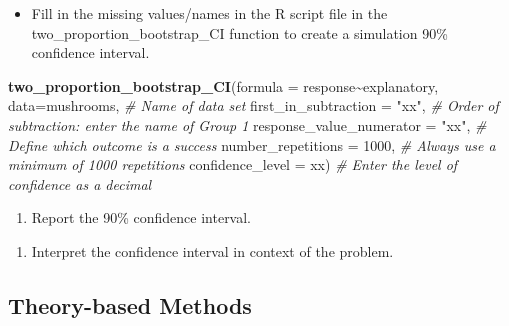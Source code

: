 \documentclass[
]{report}
\newenvironment{Shaded}{\begin{snugshade}}{\end{snugshade}}
\newcommand{\AttributeTok}[1]{\textcolor[rgb]{0.13,0.29,0.53}{#1}}
\newcommand{\CommentTok}[1]{\textcolor[rgb]{0.56,0.35,0.01}{\textit{#1}}}
\newcommand{\DecValTok}[1]{\textcolor[rgb]{0.00,0.00,0.81}{#1}}
\newcommand{\FunctionTok}[1]{\textcolor[rgb]{0.13,0.29,0.53}{\textbf{#1}}}
\newcommand{\NormalTok}[1]{#1}
\newcommand{\SpecialCharTok}[1]{\textcolor[rgb]{0.81,0.36,0.00}{\textbf{#1}}}
\newcommand{\StringTok}[1]{\textcolor[rgb]{0.31,0.60,0.02}{#1}}
\providecommand{\tightlist}{%
  \setlength{\itemsep}{0pt}\setlength{\parskip}{0pt}}
\begin{document}
\vspace{.15in}

\begin{itemize}
\tightlist
\item
  Fill in the missing values/names in the R script file in the two\_proportion\_bootstrap\_CI function to create a simulation 90\% confidence interval.
\end{itemize}

\begin{Shaded}
\begin{Highlighting}[]
\FunctionTok{two\_proportion\_bootstrap\_CI}\NormalTok{(}\AttributeTok{formula =}\NormalTok{ response}\SpecialCharTok{\textasciitilde{}}\NormalTok{explanatory, }
         \AttributeTok{data=}\NormalTok{mushrooms, }\CommentTok{\# Name of data set}
         \AttributeTok{first\_in\_subtraction =} \StringTok{"xx"}\NormalTok{, }\CommentTok{\# Order of subtraction: enter the name of Group 1}
         \AttributeTok{response\_value\_numerator =} \StringTok{"xx"}\NormalTok{, }\CommentTok{\# Define which outcome is a success }
         \AttributeTok{number\_repetitions =} \DecValTok{1000}\NormalTok{, }\CommentTok{\# Always use a minimum of 1000 repetitions}
         \AttributeTok{confidence\_level =}\NormalTok{ xx) }\CommentTok{\# Enter the level of confidence as a decimal}
\end{Highlighting}
\end{Shaded}

\begin{enumerate}
\def\labelenumi{\arabic{enumi}.}
\setcounter{enumi}{7}
\tightlist
\item
  Report the 90\% confidence interval.
\end{enumerate}

\vspace{0.2in}

\begin{enumerate}
\def\labelenumi{\arabic{enumi}.}
\setcounter{enumi}{8}
\tightlist
\item
  Interpret the confidence interval in context of the problem.
\end{enumerate}

\vspace{1in}

\subsection*{Theory-based Methods}\label{theory-based-methods-2}
\end{document}
